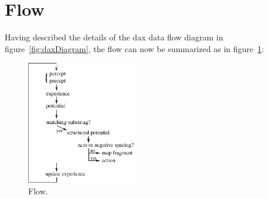 \section{Flow}
Having described the details of the dax data flow diagram in 
figure~\ref{fig:daxDiagram}, the flow can now be summarized as in
figure~\ref{fig:flow}:
\hfill\break
\begin{figure}[ht]
  \begin{center}
  \includegraphics[width=0.43\textwidth, keepaspectratio]
                                        {Eps/flow1.eps}
  \end{center}
  \caption{Flow.}
  \label{fig:flow}
\end{figure}
\hfill\break
